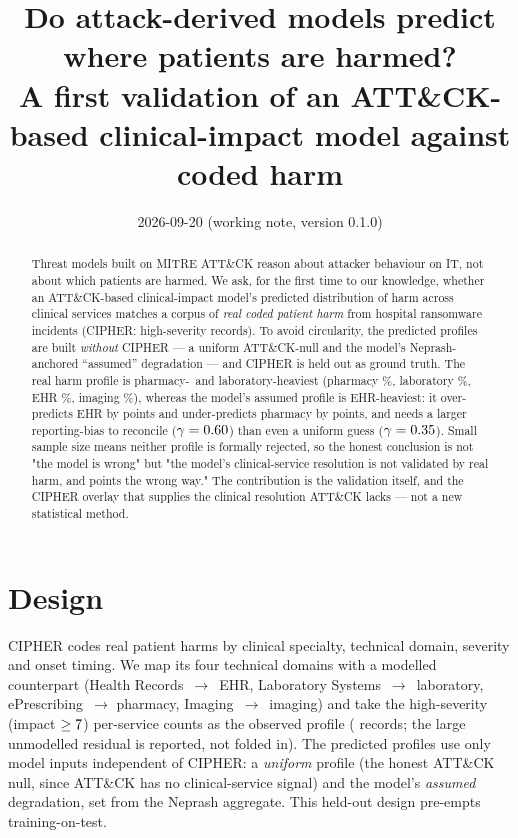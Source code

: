 \documentclass[11pt]{article}
\title{Do attack-derived models predict where patients are harmed?\\
A first validation of an ATT\&CK-based clinical-impact model against coded harm}
\author{}
\date{2026-09-20 (working note, version 0.1.0)}
\begin{document}
\maketitle

\begin{abstract}
Threat models built on MITRE ATT\&CK reason about attacker behaviour on IT, not
about which patients are harmed. We ask, for the first time to our knowledge,
whether an ATT\&CK-based clinical-impact model's predicted distribution of harm
across clinical services matches a corpus of \emph{real coded patient harm} from
hospital ransomware incidents (CIPHER: \ValHighTotal{} high-severity records). To
avoid circularity, the predicted profiles are built \emph{without} CIPHER --- a
uniform ATT\&CK-null and the model's Neprash-anchored ``assumed'' degradation ---
and CIPHER is held out as ground truth. The real harm profile is
pharmacy-\ and laboratory-heaviest (pharmacy \ValObsPharma\%, laboratory
\ValObsLab\%, EHR \ValObsEhr\%, imaging \ValObsImg\%), whereas the model's assumed
profile is EHR-heaviest: it over-predicts EHR by \ValAssumedEhrResidual{} points
and under-predicts pharmacy by \ValAssumedPharmaResidual{} points, and needs a
larger reporting-bias to reconcile ($\gamma=0.60$) than even a uniform
guess ($\gamma=0.35$). Small sample size means neither profile is
formally rejected, so the honest conclusion is not "the model is wrong" but "the
model's clinical-service resolution is not validated by real harm, and points the
wrong way." The contribution is the validation itself, and the CIPHER overlay that
supplies the clinical resolution ATT\&CK lacks --- not a new statistical method.
\end{abstract}

\section{Design}
CIPHER codes real patient harms by clinical specialty, technical domain, severity
and onset timing. We map its four technical domains with a modelled counterpart
(Health Records~$\to$~EHR, Laboratory Systems~$\to$~laboratory, ePrescribing~$\to$
pharmacy, Imaging~$\to$~imaging) and take the high-severity (impact
$\ge7$) per-service counts as the observed profile (\ValModelledRecords{}
records; the large unmodelled residual is reported, not folded in). The predicted
profiles use only model inputs independent of CIPHER: a \emph{uniform} profile (the
honest ATT\&CK null, since ATT\&CK has no clinical-service signal) and the model's
\emph{assumed} degradation, set from the Neprash aggregate. This held-out design
pre-empts training-on-test.
\end{document}
